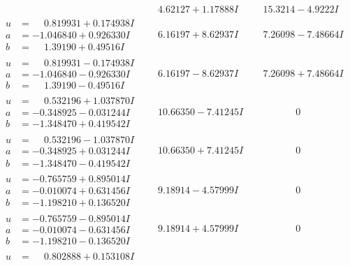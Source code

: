 \documentclass[1p]{elsarticle_modified}
\theoremstyle{definition}
\begin{document}
$$\begin{array}{c|c|c}
 & \phantom{-}4.62127 + 1.17888 I & \phantom{-}15.3214 - 4.9222 I \\ \hline\begin{aligned}
u &= \phantom{-}0.819931 + 0.174938 I \\
a &= -1.046840 + 0.926330 I \\
b &= \phantom{-}1.39190 + 0.49516 I\end{aligned}
 & \phantom{-}6.16197 + 8.62937 I & \phantom{-}7.26098 - 7.48664 I \\ \hline\begin{aligned}
u &= \phantom{-}0.819931 - 0.174938 I \\
a &= -1.046840 - 0.926330 I \\
b &= \phantom{-}1.39190 - 0.49516 I\end{aligned}
 & \phantom{-}6.16197 - 8.62937 I & \phantom{-}7.26098 + 7.48664 I \\ \hline\begin{aligned}
u &= \phantom{-}0.532196 + 1.037870 I \\
a &= -0.348925 - 0.031244 I \\
b &= -1.348470 + 0.419542 I\end{aligned}
 & \phantom{-}10.66350 - 7.41245 I & \phantom{-0.000000 } 0 \\ \hline\begin{aligned}
u &= \phantom{-}0.532196 - 1.037870 I \\
a &= -0.348925 + 0.031244 I \\
b &= -1.348470 - 0.419542 I\end{aligned}
 & \phantom{-}10.66350 + 7.41245 I & \phantom{-0.000000 } 0 \\ \hline\begin{aligned}
u &= -0.765759 + 0.895014 I \\
a &= -0.010074 + 0.631456 I \\
b &= -1.198210 + 0.136520 I\end{aligned}
 & \phantom{-}9.18914 - 4.57999 I & \phantom{-0.000000 } 0 \\ \hline\begin{aligned}
u &= -0.765759 - 0.895014 I \\
a &= -0.010074 - 0.631456 I \\
b &= -1.198210 - 0.136520 I\end{aligned}
 & \phantom{-}9.18914 + 4.57999 I & \phantom{-0.000000 } 0 \\ \hline\begin{aligned}
u &= \phantom{-}0.802888 + 0.153108 I \\

\end{aligned}
\end{array}$$
\end{document}
